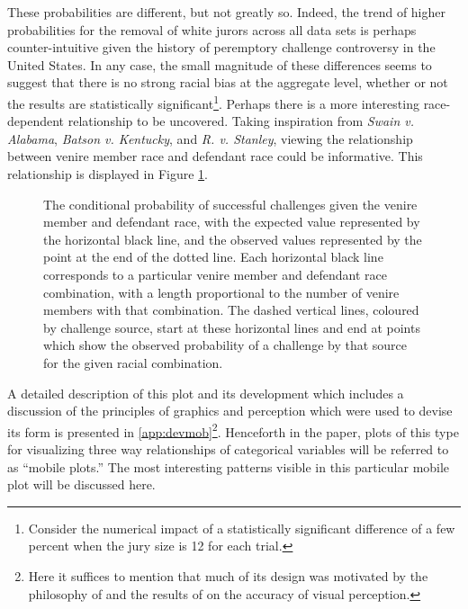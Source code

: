 These probabilities are different, but not greatly so. Indeed, the trend of higher probabilities for the removal of white jurors
across all data sets is perhaps counter-intuitive given the history of peremptory challenge controversy in the United States. In
any case, the small magnitude of these differences seems to suggest that there is no strong racial bias at the aggregate level,
whether or not the results are statistically significant\footnote{Consider the numerical impact of a statistically significant
  difference of a few percent when the jury size is 12 for each trial.}. Perhaps there is a more interesting race-dependent
relationship to be uncovered. Taking inspiration from \textit{Swain v. Alabama}, \textit{Batson v. Kentucky}, and
\textit{R. v. Stanley}, viewing the relationship between venire member race and defendant race could be informative. This
relationship is displayed in Figure \ref{fig:racedefmob}.

\begin{figure}[!h]
  \centering
  \caption[The ``Mobile Plot'' of Racial Combination and
  Strikes (Sunshine)]{\footnotesize The conditional probability of successful challenges given the
    venire member and defendant race, with the expected value represented by the horizontal black line, and the observed values
    represented by the point at the end of the dotted line. Each horizontal black line corresponds to a particular venire member
    and defendant race combination, with a length proportional to the number of venire members with that combination. The dashed
    vertical lines, coloured by challenge source, start at these horizontal lines and end at points which show the observed
    probability of a challenge by that source for the given racial combination.}
  \label{fig:racedefmob}
\end{figure}

A detailed description of this plot and its development which includes a discussion of the principles of graphics and perception
which were used to devise its form is presented in \ref{app:devmob}\footnote{Here it suffices to mention that much of its design
  was motivated by the philosophy of \cite{VisualDisplayQuant} and the results of \cite{cleveland1987} on the accuracy of visual
  perception.}. Henceforth in the paper, plots of this type for visualizing three way relationships of categorical variables will
be referred to as ``mobile plots.'' The most interesting patterns visible in this particular mobile plot will be discussed here.

